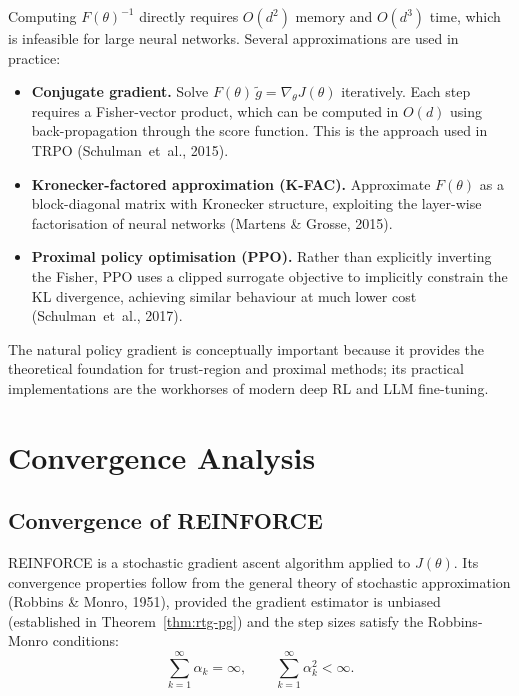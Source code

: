 Computing $F(\theta)^{-1}$ directly requires $O(d^2)$ memory and $O(d^3)$ time, which is infeasible for large neural networks.  Several approximations are used in practice:
\begin{itemize}[leftmargin=*]
\item \textbf{Conjugate gradient.}  Solve $F(\theta)\, \tilde g = \nabla_\theta J(\theta)$ iteratively.  Each step requires a Fisher-vector product, which can be computed in $O(d)$ using back-propagation through the score function.  This is the approach used in TRPO (Schulman~et~al., 2015).

\item \textbf{Kronecker-factored approximation (K-FAC).}  Approximate $F(\theta)$ as a block-diagonal matrix with Kronecker structure, exploiting the layer-wise factorisation of neural networks (Martens \& Grosse, 2015).

\item \textbf{Proximal policy optimisation (PPO).}  Rather than explicitly inverting the Fisher, PPO uses a clipped surrogate objective to implicitly constrain the KL divergence, achieving similar behaviour at much lower cost (Schulman~et~al., 2017).
\end{itemize}
The natural policy gradient is conceptually important because it provides the theoretical foundation for trust-region and proximal methods; its practical implementations are the workhorses of modern deep RL and LLM fine-tuning.

\section{Convergence Analysis}
\label{sec:pg-convergence}


\subsection{Convergence of REINFORCE}

REINFORCE is a stochastic gradient ascent algorithm applied to $J(\theta)$.  Its convergence properties follow from the general theory of stochastic approximation (Robbins \& Monro, 1951), provided the gradient estimator is unbiased (established in Theorem~\ref{thm:rtg-pg}) and the step sizes satisfy the Robbins-Monro conditions:
\begin{equation}
\label{eq:rm-conditions-ch8}
\sum_{k=1}^\infty \alpha_k = \infty, \qquad \sum_{k=1}^\infty \alpha_k^2 < \infty.
\end{equation}

